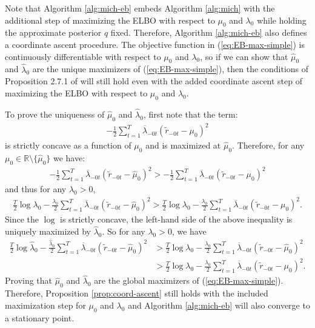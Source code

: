 

Note that Algorithm \ref{alg:mich-eb} embeds Algorithm \ref{alg:mich} with the additional step of maximizing the ELBO with respect to $\mu_0$ and $\lambda_0$ while holding the approximate posterior $q$ fixed. Therefore, Algorithm \ref{alg:mich-eb} also defines a coordinate ascent procedure. The objective function in (\ref{eq:EB-max-simple}) is continuously differentiable with respect to $\mu_0$ and $\lambda_0$, so if we can show that $\hat{\mu}_0$ and $\hat{\lambda}_0$ are the unique maximizers of (\ref{eq:EB-max-simple}), then the conditions of Proposition 2.7.1 of \cite{Bertsekas97} will still hold even with the added coordinate ascent step of maximizing the ELBO with respect to $\mu_0$ and $\lambda_0$. 

To prove the uniqueness of $\hat{\mu}_0$ and $\hat{\lambda}_0$, first note that the term:
\begin{align*}
    -\frac{1}{2}\sum_{t=1}^{T} \overline{\lambda}_{-0t}\left(\tilde{r}_{-0t}-\mu_0\right)^2
\end{align*}
is strictly concave as a function of $\mu_0$ and is maximized at $\hat{\mu}_0$. Therefore, for any $\mu_0\in\mathbb{R}\setminus\{\hat{\mu}_0\}$ we have:
\begin{align*}
    -\frac{1}{2}\sum_{t=1}^{T} \overline{\lambda}_{-0t}\left(\tilde{r}_{-0t}-\hat{\mu}_0\right)^2 > -\frac{1}{2}\sum_{t=1}^{T} \overline{\lambda}_{-0t}\left(\tilde{r}_{-0t}-\mu_0\right)^2
\end{align*}
and thus for any $\lambda_0>0$,
\begin{align*}
    \frac{T }{2}\log\lambda_0-\frac{\lambda_0}{2}\sum_{t=1}^{T} \overline{\lambda}_{-0t}\left(\tilde{r}_{-0t}-\hat{\mu}_0\right)^2 > \frac{T }{2}\log\lambda_0-\frac{\lambda_0}{2}\sum_{t=1}^{T} \overline{\lambda}_{-0t}\left(\tilde{r}_{-0t}-\mu_0\right)^2.
\end{align*}
Since the $\log$ is strictly concave, the left-hand side of the above inequality is uniquely maximized by $\hat{\lambda}_0$. So for any $\lambda_0 > 0$, we have 
\begin{align*}
    \frac{T }{2}\log\hat{\lambda}_0-\frac{\hat{\lambda}_0}{2}\sum_{t=1}^{T} \overline{\lambda}_{-0t}\left(\tilde{r}_{-0t}-\hat{\mu}_0\right)^2 &> \frac{T }{2}\log\lambda_0-\frac{\lambda_0}{2}\sum_{t=1}^{T} \overline{\lambda}_{-0t}\left(\tilde{r}_{-0t}-\hat{\mu}_0\right)^2 \\
    &> \frac{T }{2}\log\lambda_0-\frac{\lambda_0}{2}\sum_{t=1}^{T} \overline{\lambda}_{-0t}\left(\tilde{r}_{-0t}-\mu_0\right)^2.
\end{align*}
Proving that $\hat{\mu}_0$ and $\hat{\lambda}_0$ are the global maximizers of (\ref{eq:EB-max-simple}). Therefore, Proposition \ref{prop:coord-ascent} still holds with the included maximization step for $\mu_0$ and $\lambda_0$ and Algorithm \ref{alg:mich-eb} will also converge to a stationary point. 

%